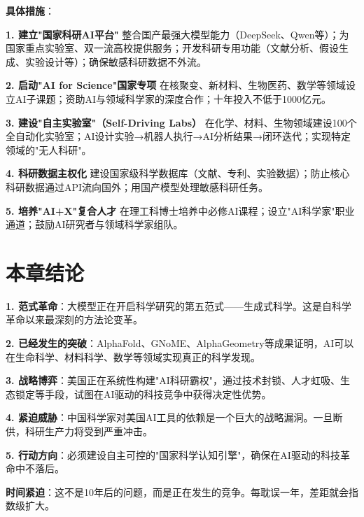 \textbf{具体措施}：

\textbf{1. 建立"国家科研AI平台"}
整合国产最强大模型能力（DeepSeek、Qwen等）；为国家重点实验室、双一流高校提供服务；开发科研专用功能（文献分析、假设生成、实验设计等）；确保敏感科研数据不外流。

\textbf{2. 启动"AI for Science"国家专项}
在核聚变、新材料、生物医药、数学等领域设立AI子课题；资助AI与领域科学家的深度合作；十年投入不低于1000亿元。

\textbf{3. 建设"自主实验室"（Self-Driving Labs）}
在化学、材料、生物领域建设100个全自动化实验室；AI设计实验→机器人执行→AI分析结果→闭环迭代；实现特定领域的"无人科研"。

\textbf{4. 科研数据主权化}
建设国家级科学数据库（文献、专利、实验数据）；防止核心科研数据通过API流向国外；用国产模型处理敏感科研任务。

\textbf{5. 培养"AI+X"复合人才}
在理工科博士培养中必修AI课程；设立"AI科学家"职业通道；鼓励AI研究者与领域科学家组队。

\section{本章结论}

\textbf{1. 范式革命}：大模型正在开启科学研究的第五范式——生成式科学。这是自科学革命以来最深刻的方法论变革。

\textbf{2. 已经发生的突破}：AlphaFold、GNoME、AlphaGeometry等成果证明，AI可以在生命科学、材料科学、数学等领域实现真正的科学发现。

\textbf{3. 战略博弈}：美国正在系统性构建"AI科研霸权"，通过技术封锁、人才虹吸、生态锁定等手段，试图在AI驱动的科技竞争中获得决定性优势。

\textbf{4. 紧迫威胁}：中国科学家对美国AI工具的依赖是一个巨大的战略漏洞。一旦断供，科研生产力将受到严重冲击。

\textbf{5. 行动方向}：必须建设自主可控的"国家科学认知引擎"，确保在AI驱动的科技革命中不落后。

\textbf{时间紧迫}：这不是10年后的问题，而是正在发生的竞争。每耽误一年，差距就会指数级扩大。

